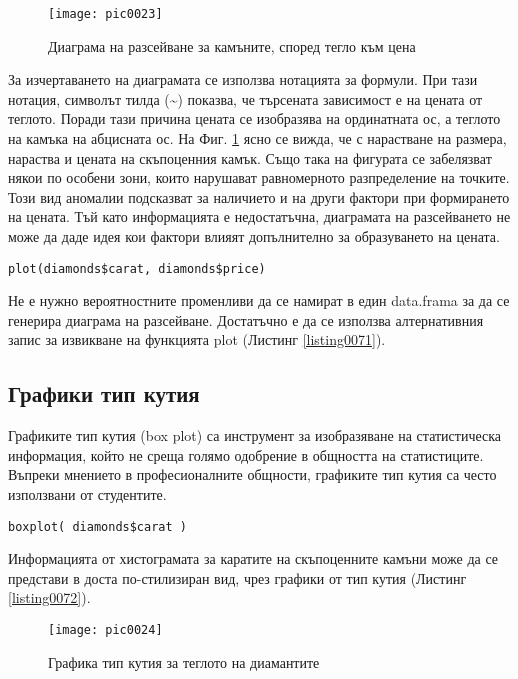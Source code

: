 \begin{figure}[h!]
  \centering
  \texttt{[image: pic0023]}
  \caption{Диаграма на разсейване за камъните, според тегло към цена}
\label{figure0023}
\end{figure}
\FloatBarrier

За изчертаването на диаграмата се използва нотацията за формули. При тази нотация, символът тилда (\textasciitilde) показва, че търсената зависимост е на цената от теглото. Поради тази причина цената се изобразява на ординатната ос, а теглото на камъка на абцисната ос. На Фиг. \ref{figure0023} ясно се вижда, че с нарастване на размера, нараства и цената на скъпоценния камък. Също така на фигурата се забелязват някои по особени зони, които нарушават равномерното разпределение на точките. Този вид аномалии подсказват за наличието и на други фактори при формирането на цената. Тъй като информацията е недостатъчна, диаграмата на разсейването не може да даде идея кои фактори влияят допълнително за образуването на цената. 

\begin{lstlisting}[caption=Алтернативна команда за диаграма на разсейване, label=listing0071]
plot(diamonds$carat, diamonds$price)
\end{lstlisting}

Не е нужно вероятностните променливи да се намират в един data.frama за да се генерира диаграма на разсейване. Достатъчно е да се използва алтернативния запис за извикване на функцията plot (Листинг \ref{listing0071}).

\subsection{Графики тип кутия}

Графиките тип кутия (box plot) са инструмент за изобразяване на статистическа информация, който не среща голямо одобрение в общността на статистиците. Въпреки мнението в професионалните общности, графиките тип кутия са често използвани от студентите. 

\begin{lstlisting}[caption=Генериране на графика от тип кутия, label=listing0072]
boxplot( diamonds$carat )
\end{lstlisting}

Информацията от хистограмата за каратите на скъпоценните камъни може да се представи в доста по-стилизиран вид, чрез графики от тип кутия (Листинг \ref{listing0072}). 

\begin{figure}[h!]
  \centering
  \texttt{[image: pic0024]}
  \caption{Графика тип кутия за теглото на диамантите}
\label{figure0024}
\end{figure}
\FloatBarrier

